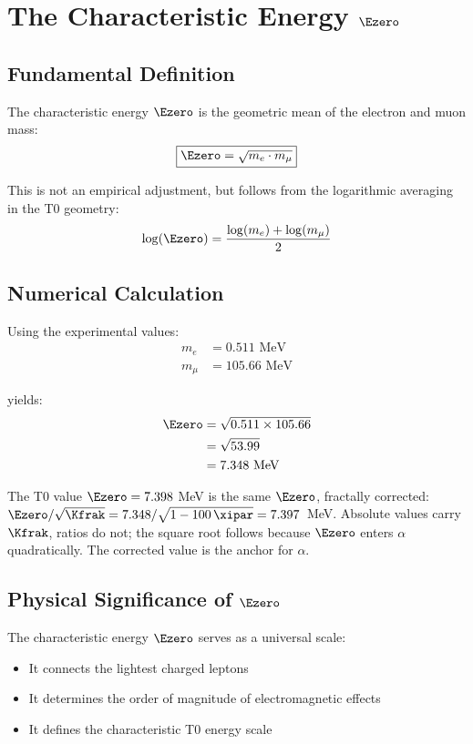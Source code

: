 	\section{The Characteristic Energy $\Ezero$}
	
	\subsection{Fundamental Definition}
	
	The characteristic energy $\Ezero$ is the geometric mean of the electron and muon mass:
	\begin{equation}
		\boxed{\Ezero = \sqrt{m_e \cdot m_\mu}}
		\label{eq:E0_fundamental}
	\end{equation}
	
	This is not an empirical adjustment, but follows from the logarithmic averaging in the T0 geometry:
	\begin{equation}
		\log(\Ezero) = \frac{\log(m_e) + \log(m_\mu)}{2}
		\label{eq:E0_logarithmic}
	\end{equation}
	
	\subsection{Numerical Calculation}
	
	Using the experimental values:
	\begin{align}
		m_e &= 0.511 \text{ MeV}\\
		m_\mu &= 105.66 \text{ MeV}
	\end{align}
	
	yields:
	\begin{align}
		\Ezero &= \sqrt{0.511 \times 105.66}\\
		&= \sqrt{53.99}\\
		&= 7.348 \text{ MeV}
	\end{align}
	
	The T0 value $\Ezero = 7.398$ MeV is the same $\Ezero$, fractally corrected: $\Ezero/\sqrt{\Kfrak} = 7.348/\sqrt{1-100\,\xipar} = 7.397$~MeV. Absolute values carry $\Kfrak$, ratios do not; the square root follows because $\Ezero$ enters $\alpha$ quadratically. The corrected value is the anchor for $\alpha$.
	
	\subsection{Physical Significance of $\Ezero$}
	
	The characteristic energy $\Ezero$ serves as a universal scale:
	\begin{itemize}
		\item It connects the lightest charged leptons
		\item It determines the order of magnitude of electromagnetic effects
		\item It defines the characteristic T0 energy scale
	\end{itemize}
	
